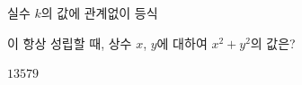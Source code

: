 실수 $k$의 값에 관계없이 등식\par\smallskip{}\par\smallskip\noindent 이 항상 성립할 때, 상수 $x$, $y$에 대하여 $x^2+y^2$의 값은?
\begin{choices32}{$1$}{$3$}{$5$}{$7$}{$9$}\end{choices32}
